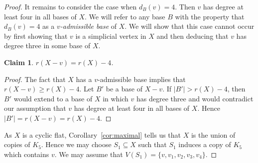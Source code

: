 \documentclass{daj}
\newtheorem{claim}[thm]{Claim}\theoremstyle{plain}
\begin{document}
\begin{proof}
It remains to consider the case when $d_B(v)=4$. Then $v$ has degree %
at least four in all bases of $X$. We will refer to any base $B$ with the property that $d_B(v)=4$  as a {\em $v$-admissible base} of $X$. We will show that this case cannot occur by first showing that $v$ is a simplicial vertex in $X$ and then deducing that $v$ has degree three in some base of $X$.

\begin{claim}\label{claim:cliquerankX-v} $r(X-v)=r(X)-4$.
\end{claim}
\begin{proof}
The fact that $X$ has a $v$-admissible base implies that $r(X-v)\geq r(X)-4$. Let $B'$ be a base of $X-v$. If $|B'|>r(X)-4$, then $B'$ would extend to a base of $X$ in which $v$ has degree three and would contradict our assumption that $v$ has degree at least four in all bases of $X$. Hence $|B'|= r(X-v)=r(X)-4$.
\end{proof}



As $X$ is a cyclic flat, Corollary~\ref{cor:maximal} tells us that
$X$ is the union of copies of $K_5$.  Hence we may choose $S_1\subseteq X$ such that $S_1$ induces a copy of $K_5$ which contains $v$.
We may assume that
$V(S_1)=\{v, v_1, v_2, v_3, v_4\}$.


\end{proof}
\end{document}

